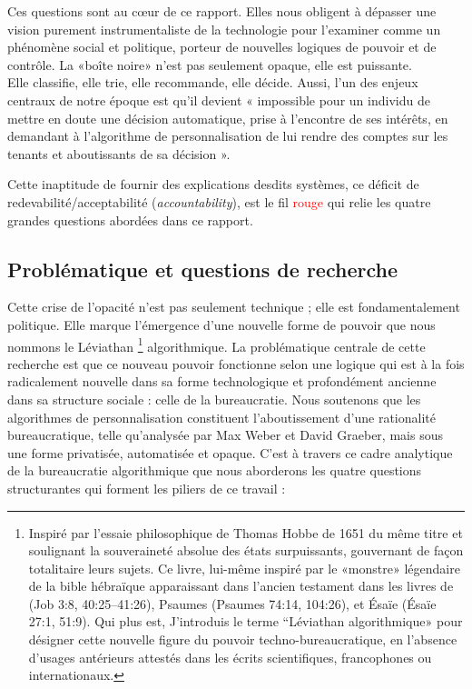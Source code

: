 Ces questions sont au cœur de ce rapport. Elles nous obligent à dépasser une vision purement instrumentaliste de la technologie pour l'examiner comme un phénomène social et politique, porteur de nouvelles logiques de pouvoir et de contrôle. La «boîte noire» n'est pas seulement opaque, elle est puissante.\\ {\large Elle classifie}, {\large elle trie}, {\LARGE elle recommande}, {\huge elle décide}. Aussi, l'un des enjeux centraux de notre époque est qu'il devient « impossible pour un individu de mettre en doute une décision automatique, prise à l'encontre de ses intérêts, en demandant à l'algorithme de personnalisation de lui rendre des comptes sur les tenants et aboutissants de sa décision ».

Cette inaptitude de fournir des explications desdits systèmes, ce déficit de redevabilité/acceptabilité (\textit{accountability}), est le fil \textcolor{red}{rouge} qui relie les quatre grandes questions abordées dans ce rapport.

\subsection{Problématique et questions de recherche}
Cette crise de l'opacité n'est pas seulement technique ; elle est fondamentalement politique. Elle marque l'émergence d'une nouvelle forme de pouvoir que nous nommons le Léviathan \footnote{Inspiré par l'essaie philosophique de Thomas Hobbe de 1651 du même titre et soulignant la souveraineté absolue des états surpuissants, gouvernant de façon totalitaire leurs sujets. Ce livre, lui-même inspiré par le «monstre» légendaire de la bible hébraïque apparaissant dans l'ancien testament dans les livres de (Job 3:8, 40:25–41:26), Psaumes (Psaumes 74:14, 104:26), et Ésaïe (Ésaïe 27:1, 51:9). Qui plus est, J’introduis le terme “Léviathan algorithmique» pour désigner cette nouvelle figure du pouvoir techno-bureaucratique, en l’absence d’usages antérieurs attestés dans les écrits scientifiques, francophones ou internationaux.} algorithmique. La problématique centrale de cette recherche est que ce nouveau pouvoir fonctionne selon une logique qui est à la fois radicalement nouvelle dans sa forme technologique et profondément ancienne dans sa structure sociale : celle de la bureaucratie. Nous soutenons que les algorithmes de personnalisation constituent l'aboutissement d'une rationalité bureaucratique, telle qu'analysée par Max Weber et David Graeber, mais sous une forme privatisée, automatisée et opaque. C'est à travers ce cadre analytique de la bureaucratie algorithmique que nous aborderons les quatre questions structurantes qui forment les piliers de ce travail :

